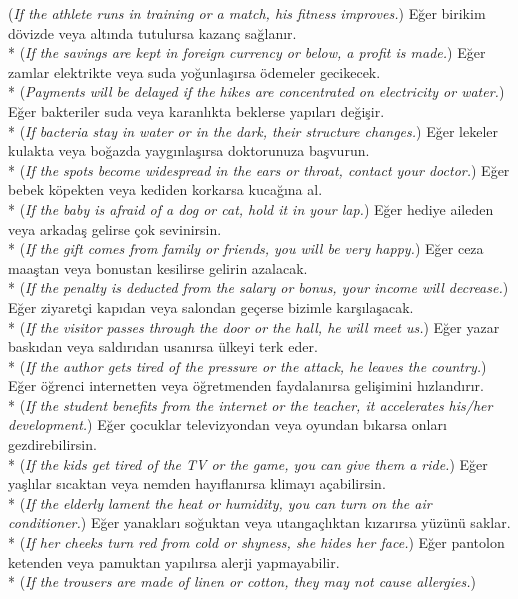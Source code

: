 ({\it If the athlete runs in training or a match, his fitness improves.})
\ex E\u{g}er birikim d\"{o}vizde veya alt{\i}nda tutulursa kazan\c{c} sa\u{g}lan{\i}r. \\*
({\it If the savings are kept in foreign currency or below, a profit is made.})
\ex E\u{g}er zamlar elektrikte veya suda yo\u{g}unla\c{s}{\i}rsa \"{o}demeler gecikecek. \\*
({\it Payments will be delayed if the hikes are concentrated on electricity or water.})
\ex E\u{g}er bakteriler suda veya karanl{\i}kta beklerse yap{\i}lar{\i} de\u{g}i\c{s}ir. \\*
({\it If bacteria stay in water or in the dark, their structure changes.})
\ex E\u{g}er lekeler kulakta veya bo\u{g}azda yayg{\i}nla\c{s}{\i}rsa doktorunuza ba\c{s}vurun. \\*
({\it If the spots become widespread in the ears or throat, contact your doctor.})
\ex E\u{g}er bebek k\"{o}pekten veya kediden korkarsa kuca\u{g}{\i}na al. \\*
({\it If the baby is afraid of a dog or cat, hold it in your lap.})
\ex E\u{g}er hediye aileden veya arkada\c{s} gelirse \c{c}ok sevinirsin. \\*
({\it If the gift comes from family or friends, you will be very happy.})
\ex E\u{g}er ceza maa\c{s}tan veya bonustan kesilirse gelirin azalacak. \\*
({\it If the penalty is deducted from the salary or bonus, your income will decrease.})
\ex E\u{g}er ziyaret\c{c}i kap{\i}dan veya salondan ge\c{c}erse bizimle kar\c{s}{\i}la\c{s}acak. \\*
({\it If the visitor passes through the door or the hall, he will meet us.})
\ex E\u{g}er yazar bask{\i}dan veya sald{\i}r{\i}dan usan{\i}rsa \"{u}lkeyi terk eder. \\*
({\it If the author gets tired of the pressure or the attack, he leaves the country.})
\ex E\u{g}er \"{o}\u{g}renci internetten veya \"{o}\u{g}retmenden faydalan{\i}rsa geli\c{s}imini h{\i}zland{\i}r{\i}r. \\*
({\it If the student benefits from the internet or the teacher, it accelerates his/her development.})
\ex E\u{g}er \c{c}ocuklar televizyondan veya oyundan b{\i}karsa onlar{\i} gezdirebilirsin. \\*
({\it If the kids get tired of the TV or the game, you can give them a ride.})
\ex E\u{g}er ya\c{s}l{\i}lar s{\i}caktan veya nemden hay{\i}flan{\i}rsa klimay{\i} a\c{c}abilirsin. \\*
({\it If the elderly lament the heat or humidity, you can turn on the air conditioner.})
\ex E\u{g}er yanaklar{\i} so\u{g}uktan veya utanga\c{c}l{\i}ktan k{\i}zar{\i}rsa y\"{u}z\"{u}n\"{u} saklar. \\*
({\it If her cheeks turn red from cold or shyness, she hides her face.})
\ex E\u{g}er pantolon ketenden veya pamuktan yap{\i}l{\i}rsa alerji yapmayabilir. \\*
({\it If the trousers are made of linen or cotton, they may not cause allergies.})
\z

